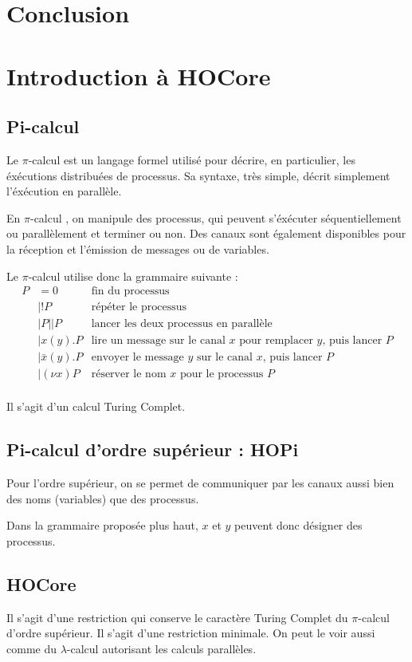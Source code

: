 \documentclass{article}
\def\pic{$\pi$-calcul }
\begin{document}
\section{Conclusion}



\newpage
\section{Introduction à HOCore}
\subsection{Pi-calcul}
Le \pic est un langage formel utilisé pour décrire, en particulier, les éxécutions distribuées de processus. Sa syntaxe, très simple, décrit simplement l'éxécution en parallèle.

En \pic, on manipule des processus, qui peuvent s'éxécuter séquentiellement ou parallèlement et terminer ou non. Des canaux sont également disponibles pour la réception et l'émission de messages ou de variables.

Le \pic utilise donc la grammaire suivante :
\begin{align*}
P &= 0 & \text{fin du processus} \\
&| !P &\text{répéter le processus}\\
&| P||P &\text{lancer les deux processus en parallèle}\\
&| x(y).P &\text{lire un message sur le canal $x$ pour remplacer $y$, puis lancer $P$}\\
&| \bar{x}(y).P &\text{envoyer le message $y$ sur le canal $x$, puis lancer $P$}\\
&| (\nu x)P &\text{réserver le nom $x$ pour le processus $P$}\\
\end{align*}

Il s'agit d'un calcul Turing Complet.

\subsection{Pi-calcul d'ordre supérieur : HOPi}
Pour l'ordre supérieur, on se permet de communiquer par les canaux aussi bien des noms (variables) que des processus.

Dans la grammaire proposée plus haut, $x$ et $y$ peuvent donc désigner des processus.

\subsection{HOCore}
Il s'agit d'une restriction qui conserve le caractère Turing Complet du \pic d'ordre supérieur. Il s'agit d'une restriction minimale. On peut le voir aussi comme du $\lambda$-calcul autorisant les calculs parallèles.
\end{document}
